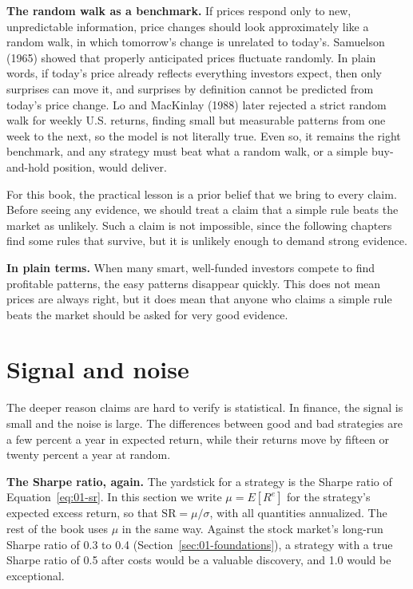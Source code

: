 \textbf{The random walk as a benchmark.} If prices respond only to new, unpredictable information, price changes should look approximately like a random walk, in which tomorrow's change is unrelated to today's. Samuelson (1965) showed that properly anticipated prices fluctuate randomly. In plain words, if today's price already reflects everything investors expect, then only surprises can move it, and surprises by definition cannot be predicted from today's price change. Lo and MacKinlay (1988) later rejected a strict random walk for weekly U.S. returns, finding small but measurable patterns from one week to the next, so the model is not literally true. Even so, it remains the right benchmark, and any strategy must beat what a random walk, or a simple buy-and-hold position, would deliver.

For this book, the practical lesson is a prior belief that we bring to every claim. Before seeing any evidence, we should treat a claim that a simple rule beats the market as unlikely. Such a claim is not impossible, since the following chapters find some rules that survive, but it is unlikely enough to demand strong evidence.

\noindent\textbf{In plain terms.} When many smart, well-funded investors compete to find profitable patterns, the easy patterns disappear quickly. This does not mean prices are always right, but it does mean that anyone who claims a simple rule beats the market should be asked for very good evidence.

\section{Signal and noise}
\label{sec:01-signal-noise}

The deeper reason claims are hard to verify is statistical. In finance, the signal is small and the noise is large. The differences between good and bad strategies are a few percent a year in expected return, while their returns move by fifteen or twenty percent a year at random.

\textbf{The Sharpe ratio, again.} The yardstick for a strategy is the Sharpe ratio of Equation~\eqref{eq:01-sr}. In this section we write $\mu = E[R^{e}]$ for the strategy's expected excess return, so that $\mathrm{SR} = \mu/\sigma$, with all quantities annualized. The rest of the book uses $\mu$ in the same way. Against the stock market's long-run Sharpe ratio of 0.3 to 0.4 (Section~\ref{sec:01-foundations}), a strategy with a true Sharpe ratio of 0.5 after costs would be a valuable discovery, and 1.0 would be exceptional.

